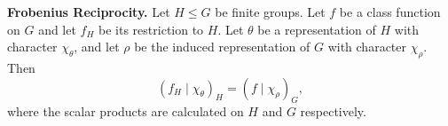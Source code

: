\textbf{Frobenius Reciprocity.} Let $H \leq G$ be finite groups. Let $f$ be a class function on $G$ and let $f_H$ be its restriction to $H$. Let $\theta$ be a representation of $H$ with character $\chi_\theta$, and let $\rho$ be the induced representation of $G$ with character $\chi_\rho$. Then
$$\left( f_H \mid \chi_\theta \right)_H = \left( f \mid \chi_\rho \right)_G,$$
where the scalar products are calculated on $H$ and $G$ respectively.
